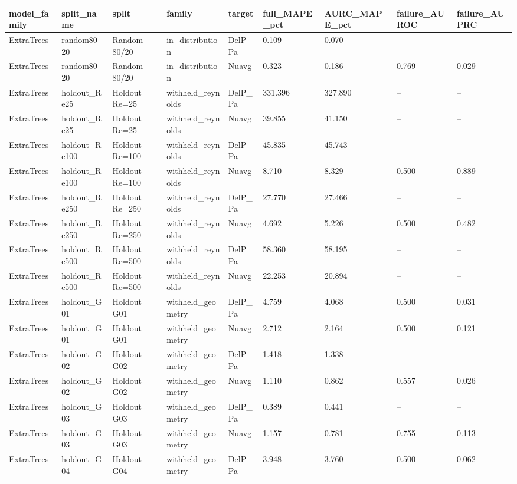 \begin{tabular}{lllllllll}
\hline
model_family & split_name & split & family & target & full_MAPE_pct & AURC_MAPE_pct & failure_AUROC & failure_AUPRC \\
\hline
ExtraTrees & random80_20 & Random 80/20 & in_distribution & DelP_Pa & 0.109 & 0.070 & -- & -- \\
ExtraTrees & random80_20 & Random 80/20 & in_distribution & Nuavg & 0.323 & 0.186 & 0.769 & 0.029 \\
ExtraTrees & holdout_Re25 & Holdout Re=25 & withheld_reynolds & DelP_Pa & 331.396 & 327.890 & -- & -- \\
ExtraTrees & holdout_Re25 & Holdout Re=25 & withheld_reynolds & Nuavg & 39.855 & 41.150 & -- & -- \\
ExtraTrees & holdout_Re100 & Holdout Re=100 & withheld_reynolds & DelP_Pa & 45.835 & 45.743 & -- & -- \\
ExtraTrees & holdout_Re100 & Holdout Re=100 & withheld_reynolds & Nuavg & 8.710 & 8.329 & 0.500 & 0.889 \\
ExtraTrees & holdout_Re250 & Holdout Re=250 & withheld_reynolds & DelP_Pa & 27.770 & 27.466 & -- & -- \\
ExtraTrees & holdout_Re250 & Holdout Re=250 & withheld_reynolds & Nuavg & 4.692 & 5.226 & 0.500 & 0.482 \\
ExtraTrees & holdout_Re500 & Holdout Re=500 & withheld_reynolds & DelP_Pa & 58.360 & 58.195 & -- & -- \\
ExtraTrees & holdout_Re500 & Holdout Re=500 & withheld_reynolds & Nuavg & 22.253 & 20.894 & -- & -- \\
ExtraTrees & holdout_G01 & Holdout G01 & withheld_geometry & DelP_Pa & 4.759 & 4.068 & 0.500 & 0.031 \\
ExtraTrees & holdout_G01 & Holdout G01 & withheld_geometry & Nuavg & 2.712 & 2.164 & 0.500 & 0.121 \\
ExtraTrees & holdout_G02 & Holdout G02 & withheld_geometry & DelP_Pa & 1.418 & 1.338 & -- & -- \\
ExtraTrees & holdout_G02 & Holdout G02 & withheld_geometry & Nuavg & 1.110 & 0.862 & 0.557 & 0.026 \\
ExtraTrees & holdout_G03 & Holdout G03 & withheld_geometry & DelP_Pa & 0.389 & 0.441 & -- & -- \\
ExtraTrees & holdout_G03 & Holdout G03 & withheld_geometry & Nuavg & 1.157 & 0.781 & 0.755 & 0.113 \\
ExtraTrees & holdout_G04 & Holdout G04 & withheld_geometry & DelP_Pa & 3.948 & 3.760 & 0.500 & 0.062 \\

\end{tabular}
